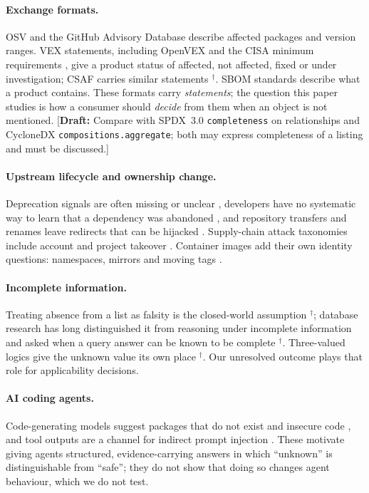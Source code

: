 \documentclass[11pt]{article}
\newcommand{\code}[1]{\texttt{#1}}
\newcommand{\citeUNV}[1]{\cite{#1}$^{\dagger}$}
\newcommand{\draftnote}[1]{\textcolor{red!70!black}{[\textbf{Draft:} #1]}}
\begin{document}
\paragraph{Exchange formats.} OSV \cite{osvschema} and the GitHub Advisory
Database \cite{ghsa} describe affected packages and version ranges. VEX
statements, including OpenVEX \cite{openvex} and the CISA minimum requirements
\cite{cisa2023vex}, give a product status of affected, not affected, fixed or
under investigation; CSAF carries similar statements \citeUNV{oasis2022csaf}.
SBOM standards \cite{spdx,ecma424} describe what a product contains. These
formats carry \emph{statements}; the question this paper studies is how a
consumer should \emph{decide} from them when an object is not mentioned.
\draftnote{Compare with SPDX~3.0 \code{completeness} on relationships and
CycloneDX \code{compositions.aggregate}; both may express completeness of a
listing and must be discussed.}

\paragraph{Upstream lifecycle and ownership change.} Deprecation signals are
often missing or unclear \cite{cogo2022deprecation}, developers have no
systematic way to learn that a dependency was abandoned
\cite{miller2023winging}, and repository transfers and renames leave
redirects that can be hijacked \cite{github2026transfer,goldman2023repojacking}.
Supply-chain attack taxonomies include account and project takeover
\cite{ohm2020backstabber,ladisa2023sok,zimmermann2019small}. Container images
add their own identity questions: namespaces, mirrors and moving tags
\cite{shu2017dockerhub,zerouali2019outdated}.

\paragraph{Incomplete information.} Treating absence from a list as falsity
is the closed-world assumption \citeUNV{reiter1978closed}; database research
has long distinguished it from reasoning under incomplete information and
asked when a query answer can be known to be complete
\citeUNV{razniewski2011completeness}. Three-valued logics give the unknown
value its own place \citeUNV{kleene1952introduction}. Our unresolved outcome
plays that role for applicability decisions.

\paragraph{AI coding agents.} Code-generating models suggest packages that do
not exist \cite{spracklen2025package,krishna2025phantoms} and insecure code
\cite{pearce2022asleep}, and tool outputs are a channel for indirect prompt
injection \cite{greshake2023indirect,debenedetti2024agentdojo}. These motivate
giving agents structured, evidence-carrying answers in which ``unknown'' is
distinguishable from ``safe''; they do not show that doing so changes agent
behaviour, which we do not test.
\end{document}
